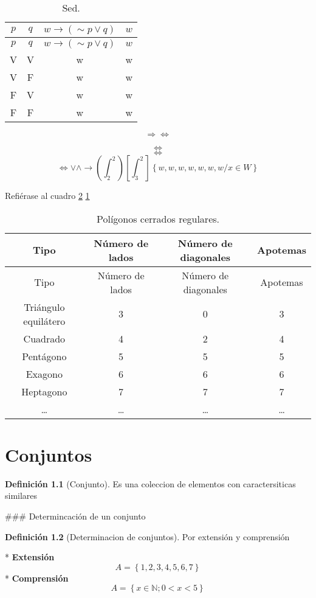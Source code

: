 \documentclass[16pt,]{krantz}
\theoremstyle{definition}
\newtheorem{definition}{Definición}[chapter]
\theoremstyle{definition}
\theoremstyle{definition}
\theoremstyle{definition}
\theoremstyle{remark}
\begin{document}
\begin{longtable}[]{@{}cccl@{}}
\caption{\label{tab:ww} Sed.}\tabularnewline
\toprule
\(p\) & \(q\) & \(w \rightarrow \left( \sim p \vee q\right)\) & \(w\)\tabularnewline
\midrule
\endfirsthead
\toprule
\(p\) & \(q\) & \(w \rightarrow \left( \sim p \vee q\right)\) & \(w\)\tabularnewline
\midrule
\endhead
V & V & w & w\tabularnewline
V & F & w & w\tabularnewline
F & V & w & w\tabularnewline
F & F & w & w\tabularnewline
\bottomrule
\end{longtable}

\[ \Longrightarrow \Longleftrightarrow  \]

\[ \Longleftrightarrow  \]
\[ \Longleftrightarrow  \]
\[ \Longleftrightarrow \vee \wedge \rightarrow \left( \int_{2}^{2} \right) \left[ \int_{3}^{2} \right]  \left\{ w,w,w,w,w,w,w/x \in W \right\}  \]

Refiérase al cuadro \ref{tab:regulares} \ref{tab:ww}

\begin{longtable}[]{@{}cccc@{}}
\caption{\label{tab:regulares} Polígonos cerrados regulares.}\tabularnewline
\toprule
Tipo & Número de lados & Número de diagonales & Apotemas\tabularnewline
\midrule
\endfirsthead
\toprule
Tipo & Número de lados & Número de diagonales & Apotemas\tabularnewline
\midrule
\endhead
Triángulo equilátero & 3 & 0 & 3\tabularnewline
Cuadrado & 4 & 2 & 4\tabularnewline
Pentágono & 5 & 5 & 5\tabularnewline
Exagono & 6 & 6 & 6\tabularnewline
Heptagono & 7 & 7 & 7\tabularnewline
\ldots{} & \ldots{} & \ldots{} & \ldots{}\tabularnewline
\bottomrule
\end{longtable}

\hypertarget{conjuntos}{%
\chapter{Conjuntos}\label{conjuntos}}

\begin{definition}[Conjunto]
\protect\hypertarget{def:conjunto}{}{\label{def:conjunto} \iffalse (Conjunto) \fi{} }Es una coleccion de elementos con caractersiticas similares
\end{definition}
\#\#\# Determincación de un conjunto

\begin{definition}[Determinacion de conjuntos]
\protect\hypertarget{def:conjunto2}{}{\label{def:conjunto2} \iffalse (Determinacion de conjuntos) \fi{} }Por extensión y comprensión
\end{definition}
* \textbf{Extensión}
\[A=\left\{ 1,2,3,4,5,6,7 \right\} \]
* \textbf{Comprensión}
\[A=\left\{ x \in \mathbb{N};0<x<5 \right\}  \]
\end{document}
